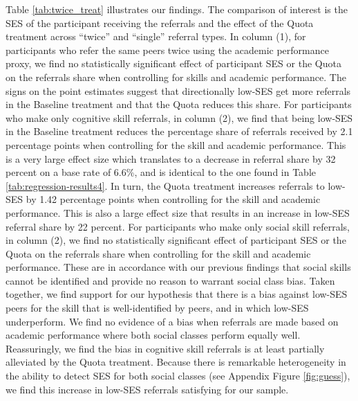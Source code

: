 \documentclass[11pt,a4paper,oneside]{article}
\begin{document}
  Table \ref{tab:twice_treat} illustrates our findings. The comparison of interest is the SES of the participant receiving the referrals and the effect of the Quota treatment across ``twice'' and ``single'' referral types. In column (1), for participants who refer the same peers twice using the academic performance proxy, we find no statistically significant effect of participant SES or the Quota on the referrals share when controlling for skills and academic performance. The signs on the point estimates suggest that directionally low-SES get more referrals in the Baseline treatment and that the Quota reduces this share. For participants who make only cognitive skill referrals, in column (2), we find that being low-SES in the Baseline treatment reduces the percentage share of referrals received by 2.1 percentage points when controlling for the skill and academic performance. This is a very large effect size which translates to a decrease in referral share by 32 percent on a base rate of 6.6\%, and is identical to the one found in Table \ref{tab:regression-results4}. In turn, the Quota treatment increases referrals to low-SES by 1.42 percentage points when controlling for the skill and academic performance. This is also a large effect size that results in an increase in low-SES referral share by 22 percent. For participants who make only social skill referrals, in column (2), we find no statistically significant effect of participant SES or the Quota on the referrals share when controlling for the skill and academic performance. These are in accordance with our previous findings that social skills cannot be identified and provide no reason to warrant social class bias. Taken together, we find support for our hypothesis that there is a bias against low-SES peers for the skill that is well-identified by peers, and in which low-SES underperform. We find no evidence of a bias when referrals are made based on academic performance where both social classes perform equally well. Reassuringly, we find the bias in cognitive skill referrals is at least partially alleviated by the Quota treatment. Because there is remarkable heterogeneity in the ability to detect SES for both social classes (see Appendix Figure \ref{fig:guess}), we find this increase in low-SES referrals satisfying for our sample.
\end{document}
